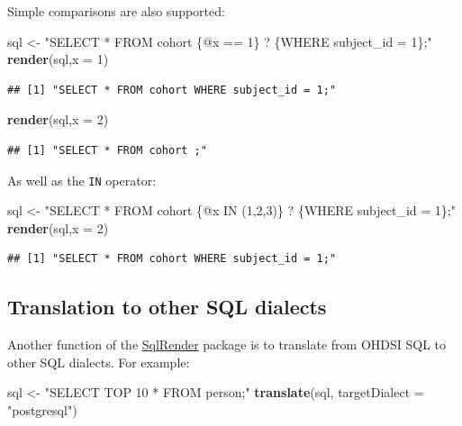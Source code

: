 \documentclass[]{book}
\newenvironment{Shaded}{\begin{snugshade}}{\end{snugshade}}
\newcommand{\KeywordTok}[1]{\textcolor[rgb]{0.13,0.29,0.53}{\textbf{#1}}}
\newcommand{\DataTypeTok}[1]{\textcolor[rgb]{0.13,0.29,0.53}{#1}}
\newcommand{\DecValTok}[1]{\textcolor[rgb]{0.00,0.00,0.81}{#1}}
\newcommand{\StringTok}[1]{\textcolor[rgb]{0.31,0.60,0.02}{#1}}
\newcommand{\NormalTok}[1]{#1}
\begin{document}
Simple comparisons are also supported:

\begin{Shaded}
\begin{Highlighting}[]
\NormalTok{sql <-}\StringTok{ "SELECT * FROM cohort \{@x == 1\} ? \{WHERE subject_id = 1\};"}
\KeywordTok{render}\NormalTok{(sql,}\DataTypeTok{x =} \DecValTok{1}\NormalTok{)}
\end{Highlighting}
\end{Shaded}

\begin{verbatim}
## [1] "SELECT * FROM cohort WHERE subject_id = 1;"
\end{verbatim}

\begin{Shaded}
\begin{Highlighting}[]
\KeywordTok{render}\NormalTok{(sql,}\DataTypeTok{x =} \DecValTok{2}\NormalTok{)}
\end{Highlighting}
\end{Shaded}

\begin{verbatim}
## [1] "SELECT * FROM cohort ;"
\end{verbatim}

As well as the \texttt{IN} operator:

\begin{Shaded}
\begin{Highlighting}[]
\NormalTok{sql <-}\StringTok{ "SELECT * FROM cohort \{@x IN (1,2,3)\} ? \{WHERE subject_id = 1\};"}
\KeywordTok{render}\NormalTok{(sql,}\DataTypeTok{x =} \DecValTok{2}\NormalTok{)}
\end{Highlighting}
\end{Shaded}

\begin{verbatim}
## [1] "SELECT * FROM cohort WHERE subject_id = 1;"
\end{verbatim}

\subsection{Translation to other SQL
dialects}\label{translation-to-other-sql-dialects}

Another function of the
\href{https://ohdsi.github.io/SqlRender/}{SqlRender} package is to
translate from OHDSI SQL to other SQL dialects. For example:

\begin{Shaded}
\begin{Highlighting}[]
\NormalTok{sql <-}\StringTok{ "SELECT TOP 10 * FROM person;"}
\KeywordTok{translate}\NormalTok{(sql, }\DataTypeTok{targetDialect =} \StringTok{"postgresql"}\NormalTok{)}
\end{Highlighting}
\end{Shaded}
\end{document}

